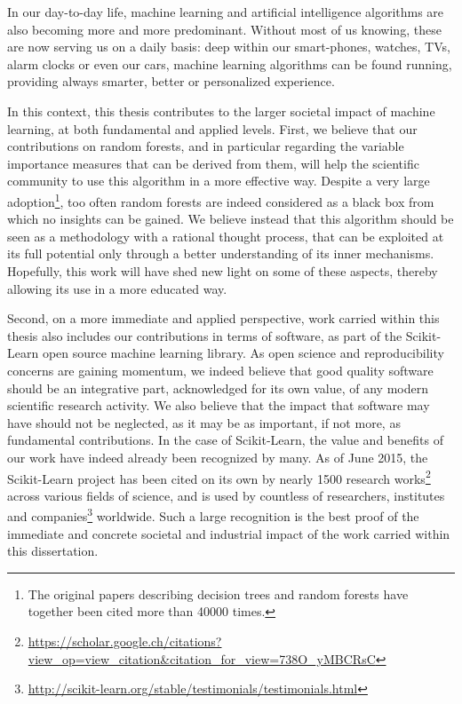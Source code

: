 In our day-to-day life, machine learning and artificial intelligence algorithms
are also becoming more and more predominant. Without most of us knowing, these
are now serving us on a daily basis: deep within our smart-phones, watches,
TVs, alarm clocks or even our cars, machine learning algorithms can be  found
running, providing always smarter, better or personalized experience.

In this context, this thesis contributes to the larger societal impact of
machine learning, at both fundamental and applied levels. First, we believe
that our contributions on random forests, and in particular regarding the
variable importance measures that can be derived from them, will help the scientific
community to use this algorithm in a more effective way. Despite a very large
adoption\footnote{The original papers describing decision trees and random
forests have together been cited more than 40000 times.}, too often random
forests are indeed considered as a black box from which no insights can be
gained. We believe instead that this algorithm should be seen as a
methodology with a rational thought process, that can be exploited at its full
potential only through a better understanding of its inner mechanisms.
Hopefully, this work will have shed new light on some of these aspects, thereby
allowing its use in a more educated way.

Second, on a more immediate and applied perspective, work carried within this
thesis also includes our contributions in terms of software, as part of the Scikit-Learn
open source machine learning library.  As open science and reproducibility concerns
are gaining momentum, we indeed believe that good quality software should be an
integrative part, acknowledged for its own value, of any modern scientific
research activity. We also believe that the impact that software may have
should not be neglected, as it may be as important, if not more, as
fundamental contributions. In the case of Scikit-Learn, the value and benefits
of our work have indeed already been recognized by many. As of June 2015, the
Scikit-Learn project has been cited on its own by nearly 1500 research
works\footnote{\url{https://scholar.google.ch/citations?view_op=view_citation&citation_for_view=738O_yMBCRsC}} across various fields of science,
and is used by countless of researchers,
institutes and
companies\footnote{\url{http://scikit-learn.org/stable/testimonials/testimonials.html}} worldwide.
Such a large recognition is the best proof of the immediate and concrete societal and industrial impact of the work carried within this dissertation.


